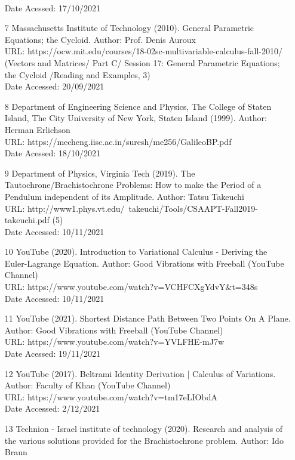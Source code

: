 \documentclass[12pt]{report}
\begin{document}
\begin{itemize}
    \\
    Date Acessed: 17/10/2021
    \item [7] Massachusetts Institute of Technology (2010). General Parametric Equations; the Cycloid. Author: Prof. Denis Auroux
    \\
    URL: https://ocw.mit.edu/courses/18-02sc-multivariable-calculus-fall-2010/ (Vectors and Matrices/ Part C/ Session 17: General Parametric Equations; the Cycloid /Reading and Examples, 3)
    \\
    Date Accessed: 20/09/2021
    \item [8] Department of Engineering Science and Physics, The College of Staten Island, The City University of New York, Staten Island (1999). Author: Herman Erlichson
    \\
    URL: https://mecheng.iisc.ac.in/suresh/me256/GalileoBP.pdf
    \\
    Date Acessed: 18/10/2021
    \item [9] Department of Physics, Virginia Tech (2019). The Tautochrone/Brachistochrone Problems: How to make the Period of a Pendulum independent of its Amplitude. Author: Tatsu Takeuchi
    \\
    URL: http://www1.phys.vt.edu/~takeuchi/Tools/CSAAPT-Fall2019-takeuchi.pdf (5)
    \\
    Date Accessed: 10/11/2021
    \item [10] YouTube (2020). Introduction to Variational Calculus - Deriving the Euler-Lagrange Equation. Author: Good Vibrations with Freeball (YouTube Channel)
    \\
    URL: https://www.youtube.com/watch?v=VCHFCXgYdvY&t=348s
    \\
    Date Accessed: 10/11/2021
    \item [11] YouTube (2021). Shortest Distance Path Between Two Points On A Plane. Author: Good Vibrations with Freeball (YouTube Channel)
    \\
    URL: https://www.youtube.com/watch?v=YVLFHE-mJ7w
    \\
    Date Acessed: 19/11/2021
    \item [12] YouTube (2017). Beltrami Identity Derivation | Calculus of Variations. Author: Faculty of Khan (YouTube Channel)
    \\
    URL: https://www.youtube.com/watch?v=tm17eLIObdA
    \\
    Date Accessed: 2/12/2021
    \item [13] Technion - Israel institute of technology (2020). Research and analysis of the various solutions provided for the Brachistochrone problem. Author: Ido Braun

\end{itemize}
\end{document}
